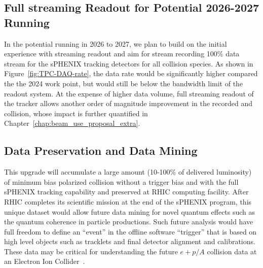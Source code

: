 

\subsection{Full streaming Readout for Potential 2026-2027 Running}

In the potential running in 2026 to 2027, we plan to build on the initial experience with streaming readout and aim for stream recording 100\% data stream for the sPHENIX tracking detectors for all collision species. As shown in Figure~\ref{fig:TPC-DAQ-rate}, the data rate would be significantly higher compared the the 2024 work point, but would still be below the bandwidth limit of the readout system. At the expense of higher data volume, full streaming readout of the tracker allows another order of magnitude improvement in the recorded \pp and \pA collision, whose impact is further quantified in Chapter~\ref{chap:beam_use_proposal_extra}.

\subsection{Data Preservation and Data Mining}

This upgrade will accumulate a large amount (10-100\% of delivered luminosity) 
of minimum
bias polarized \pp collision without a trigger bias and with the full
sPHENIX tracking capability and preserved at RHIC computing facility. 
After RHIC completes its scientific
mission at the end of the sPHENIX program, this unique dataset would  allow future data mining for novel quantum effects such as
the quantum coherence in particle productions. 
Such future analysis would have full freedom to define an ``event'' in the offline software ``trigger'' that is based on high level objects such as tracklets and final detector alignment and calibrations. 
These \pp data may be
critical for understanding the future $e+p/A$ collision data at an
Electron Ion Collider~\cite{Accardi2012}.
